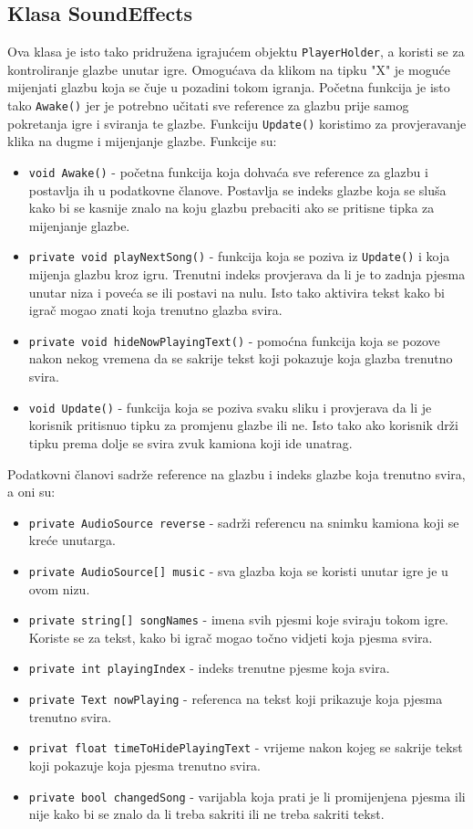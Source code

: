 \subsection{Klasa SoundEffects}
Ova klasa je isto tako pridružena igrajućem objektu \texttt{PlayerHolder}, a koristi se za kontroliranje glazbe unutar igre. Omogućava da klikom na tipku "X" je moguće mijenjati glazbu koja se čuje u pozadini tokom igranja. Početna funkcija je isto tako \texttt{Awake()} jer je potrebno učitati sve reference za glazbu prije samog pokretanja igre i sviranja te glazbe. Funkciju \texttt{Update()} koristimo za provjeravanje klika na dugme i mijenjanje glazbe. Funkcije su:
\begin{itemize}
	\item \texttt{void Awake()} - početna funkcija koja dohvaća sve reference za glazbu i postavlja ih u podatkovne članove. Postavlja se indeks glazbe koja se sluša kako bi se kasnije znalo na koju glazbu prebaciti ako se pritisne tipka za mijenjanje glazbe.
	\item \texttt{private void playNextSong()} - funkcija koja se poziva iz \newline \texttt{Update()} i koja mijenja glazbu kroz igru. Trenutni indeks provjerava da li je to zadnja pjesma unutar niza i poveća se ili postavi na nulu. Isto tako aktivira tekst kako bi igrač mogao znati koja trenutno glazba svira.
	\item \texttt{private void hideNowPlayingText()} - pomoćna funkcija koja se pozove nakon nekog vremena da se sakrije tekst koji pokazuje koja glazba trenutno svira.
	\item \texttt{void Update()} - funkcija koja se poziva svaku sliku i provjerava da li je korisnik pritisnuo tipku za promjenu glazbe ili ne. Isto tako ako korisnik drži tipku prema dolje se svira zvuk kamiona koji ide unatrag.
\end{itemize}
Podatkovni članovi sadrže reference na glazbu i indeks glazbe koja trenutno svira, a oni su:
\begin{itemize}
	\item \texttt{private AudioSource reverse} - sadrži referencu na snimku kamiona koji se kreće unutarga.
	\item \texttt{private AudioSource[] music} - sva glazba koja se koristi unutar igre je u ovom nizu.
	\item \texttt{private string[] songNames} - imena svih pjesmi koje sviraju tokom igre. Koriste se za tekst, kako bi igrač mogao točno vidjeti koja pjesma svira.
	\item \texttt{private int playingIndex} - indeks trenutne pjesme koja svira.
	\item \texttt{private Text nowPlaying} - referenca na tekst koji prikazuje koja pjesma trenutno svira.
	\item \texttt{privat float timeToHidePlayingText} - vrijeme nakon kojeg se sakrije tekst koji pokazuje koja pjesma trenutno svira.
	\item \texttt{private bool changedSong} - varijabla koja prati je li promijenjena pjesma ili nije kako bi se znalo da li treba sakriti ili ne treba sakriti tekst.
\end{itemize}
